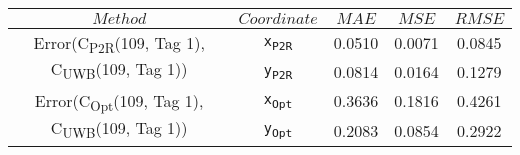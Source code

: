 \begin{table}[h]
\centering
\begin{tabular}{|c|c|c|c|c|}
\hline
$Method$ & $Coordinate$ & $MAE$ & $MSE$ & $RMSE$ \\
\hline
\multirow{2}{*}{{\footnotesize Error(C\textsubscript{P2R}(109, Tag 1), C\textsubscript{UWB}(109, Tag 1))}} & \texttt{x\textsubscript{P2R}} & 0.0510 & 0.0071 & 0.0845 \\
& \texttt{y\textsubscript{P2R}} & 0.0814 & 0.0164 & 0.1279 \\
\hline
\multirow{2}{*}{{\footnotesize Error(C\textsubscript{Opt}(109, Tag 1), C\textsubscript{UWB}(109, Tag 1))}} & \texttt{x\textsubscript{Opt}} & 0.3636 & 0.1816 & 0.4261 \\
& \texttt{y\textsubscript{Opt}} & 0.2083 & 0.0854 & 0.2922 \\
\hline
\end{tabular}
\end{table}
